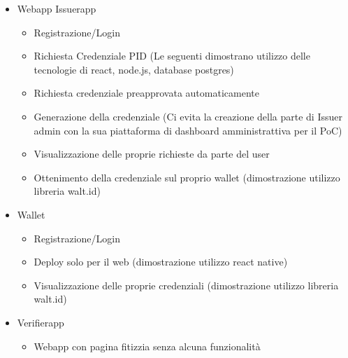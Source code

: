\begin{itemize}
 \item Webapp Issuerapp
\begin{itemize}
\item Registrazione/Login 
\item Richiesta Credenziale PID
(Le seguenti dimostrano utilizzo delle tecnologie di react, node.js, database postgres)
\item Richiesta credenziale preapprovata automaticamente
\item Generazione della credenziale
(Ci evita la creazione della parte di Issuer admin con la sua piattaforma di dashboard amministrattiva per il PoC)
\item Visualizzazione delle proprie richieste da parte del user
\item Ottenimento della credenziale sul proprio wallet
(dimostrazione utilizzo libreria walt.id)
\end{itemize}

\item Wallet
\begin{itemize}
\item Registrazione/Login
\item Deploy solo per il web
(dimostrazione utilizzo react native)
\item Visualizzazione delle proprie credenziali
(dimostrazione utilizzo libreria walt.id)
\end{itemize}

\item Verifierapp
\begin{itemize}
\item Webapp con pagina fitizzia senza alcuna funzionalità
\end{itemize}
\end{itemize}
   